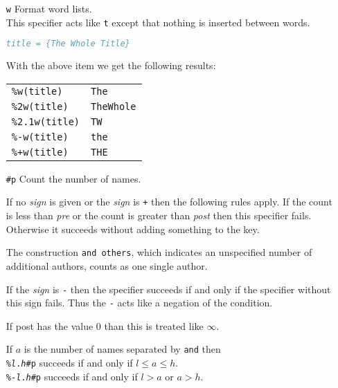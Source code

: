\documentclass[11pt,a4paper]{scrbook}
\begin{document}
\begin{itemize}
  \item [\texttt{w}] Format word lists.\\
    This specifier acts like \texttt{t} except that nothing is inserted
    between words.

    \begin{Example}
      \begin{lstlisting}[language=BibTeX]
  title = {The Whole Title}
      \end{lstlisting}\vspace{-2ex}
      With the above item we get the following results:

      \begin{tabular}{ll}
        \texttt{\%w(title)}	& \texttt{The}		\\
        \texttt{\%2w(title)}	& \texttt{TheWhole}	\\
        \texttt{\%2.1w(title)}	& \texttt{TW}		\\
        \texttt{\%-w(title)}	& \texttt{the}		\\
        \texttt{\%+w(title)}	& \texttt{THE}
      \end{tabular}
    \end{Example}

  \item [\texttt{\#p}] Count the number of names.

    If no \textit{sign} is given or the \textit{sign} is \verb|+| then the
    following rules apply. If the count is less than \textit{pre} or the count
    is greater than \textit{post} then this specifier fails. Otherwise it
    succeeds without adding something to the key.

    The construction \verb|and others|, which indicates an unspecified number
    of additional authors, counts as one single author.

    If the \textit{sign} is \verb|-| then the specifier succeeds if and only
    if the specifier without this sign fails. Thus the \verb|-| acts like a
    negation of the condition.

    If post has the value 0 than this is treated like \(\infty\).

    If \(a\) is the number of names separated by \texttt{and} then\\
    \texttt{\%\textit{l}.\textit{h}\#p} succeeds if and only if
    \(l\leq a\leq h\).\\
    \texttt{\%-\textit{l}.\textit{h}\#p} succeeds if and only if \(l>a\) or
    \(a>h\).


\end{itemize}
\end{document}
